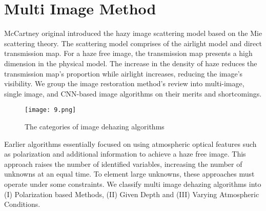\documentclass[doctor,english,listoffigures,listoftables]{thesis-uestc}
\begin{document}
\section{Multi Image Method}
McCartney original introduced the hazy image scattering model based on the Mie scattering theory. The scattering model comprises of the airlight model and direct transmission map. For a haze free image, the transmission map presents a high dimension in the physical model. The increase in the density of haze reduces the transmission map's proportion while airlight increases, reducing the image's visibility. We group the image restoration method's review into multi-image, single image, and CNN-based image algorithms on their merits and shortcomings. 

\begin{figure}[H]
	\centering
	\texttt{[image: 9.png]}
	\caption{The categories of image dehazing algorithms}
	\label{fig4}
\end{figure}

Earlier algorithms essentially focused on using atmospheric optical features such as polarization and additional information to achieve a haze free image. This approach raises the number of identified variables, increasing the number of unknowns at an equal time. To element large unknowns, these approaches must operate under some constraints. We classify multi image dehazing algorithms into (I) Polarization based Methods, (II) Given Depth and (III) Varying Atmospheric Conditions. 
\end{document}
